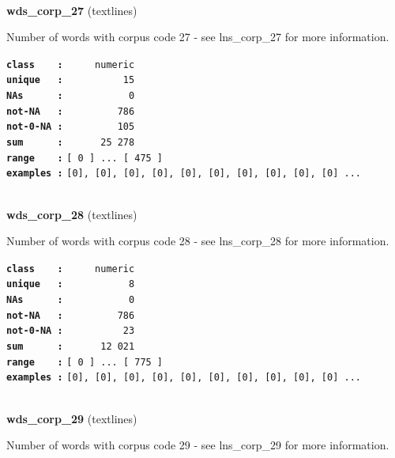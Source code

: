 \documentclass[]{article}
\begin{document}
~

\textbf{wds\_corp\_27} (textlines)

Number of words with corpus code 27 - see lns\_corp\_27 for more
information.

\textbf{\texttt{class\ \ \ \ :}} \texttt{~~~~~numeric}\\
\textbf{\texttt{unique\ \ \ :}} \texttt{~~~~~~~~~~15}\\
\textbf{\texttt{NAs\ \ \ \ \ \ :}} \texttt{~~~~~~~~~~~0}\\
\textbf{\texttt{not-NA\ \ \ :}} \texttt{~~~~~~~~~786}\\
\textbf{\texttt{not-0-NA\ :}} \texttt{~~~~~~~~~105}\\
\textbf{\texttt{sum\ \ \ \ \ \ :}} \texttt{~~~~~~25~278}\\
\textbf{\texttt{range\ \ \ \ :}}
\texttt{{[}\ 0\ {]}\ ...\ {[}\ 475\ {]}}\\
\textbf{\texttt{examples\ :}}
\texttt{{[}0{]},\ {[}0{]},\ {[}0{]},\ {[}0{]},\ {[}0{]},\ {[}0{]},\ {[}0{]},\ {[}0{]},\ {[}0{]},\ {[}0{]}\ ...}\\

~

\textbf{wds\_corp\_28} (textlines)

Number of words with corpus code 28 - see lns\_corp\_28 for more
information.

\textbf{\texttt{class\ \ \ \ :}} \texttt{~~~~~numeric}\\
\textbf{\texttt{unique\ \ \ :}} \texttt{~~~~~~~~~~~8}\\
\textbf{\texttt{NAs\ \ \ \ \ \ :}} \texttt{~~~~~~~~~~~0}\\
\textbf{\texttt{not-NA\ \ \ :}} \texttt{~~~~~~~~~786}\\
\textbf{\texttt{not-0-NA\ :}} \texttt{~~~~~~~~~~23}\\
\textbf{\texttt{sum\ \ \ \ \ \ :}} \texttt{~~~~~~12~021}\\
\textbf{\texttt{range\ \ \ \ :}}
\texttt{{[}\ 0\ {]}\ ...\ {[}\ 775\ {]}}\\
\textbf{\texttt{examples\ :}}
\texttt{{[}0{]},\ {[}0{]},\ {[}0{]},\ {[}0{]},\ {[}0{]},\ {[}0{]},\ {[}0{]},\ {[}0{]},\ {[}0{]},\ {[}0{]}\ ...}\\

~

\textbf{wds\_corp\_29} (textlines)

Number of words with corpus code 29 - see lns\_corp\_29 for more
information.
\end{document}
